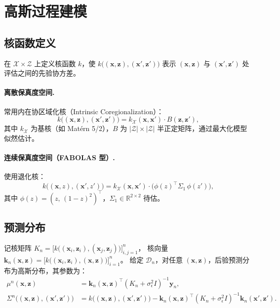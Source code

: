 \documentclass[11pt,a4paper]{article}
\newcommand{\bx}{\mathbf{x}}
\newcommand{\bz}{\mathbf{z}}
\newcommand{\cX}{\mathcal{X}}
\newcommand{\cZ}{\mathcal{Z}}
\newcommand{\cD}{\mathcal{D}}
\newcommand{\R}{\mathbb{R}}
\begin{document}
\section{高斯过程建模}

\subsection{核函数定义}

在 $\cX\times\cZ$ 上定义核函数 $k$，使
$k\bigl((\bx,\bz),(\bx',\bz')\bigr)$
表示 $(\bx,\bz)$ 与 $(\bx',\bz')$ 处评估之间的先验协方差。

\paragraph{离散保真度空间.}
常用内在协区域化核（Intrinsic Coregionalization）：
\begin{equation}
  k\bigl((\bx,\bz),(\bx',\bz')\bigr) = k_{\cX}(\bx,\bx')\cdot B(\bz,\bz'),
\end{equation}
其中 $k_{\cX}$ 为基核（如 Mat\'ern 5/2），$B$ 为 $|\cZ|\times|\cZ|$ 半正定矩阵，通过最大化模型似然估计。

\paragraph{连续保真度空间（FABOLAS 型）.}
使用退化核：
\begin{equation}
  k\bigl((\bx,z),(\bx',z')\bigr) = k_{\cX}(\bx,\bx')\cdot\bigl(\phi(z)^\top\Sigma_1\,\phi(z')\bigr),
\end{equation}
其中 $\phi(z)=(z,\,(1-z)^2)^\top$，$\Sigma_1\in\R^{2\times 2}$ 待估。

\subsection{预测分布}

记核矩阵 $K_n = \bigl[k\bigl((\bx_i,\bz_i),(\bx_j,\bz_j)\bigr)\bigr]_{i,j=1}^{n}$，
核向量 $\mathbf{k}_n(\bx,\bz) = \bigl[k\bigl((\bx_i,\bz_i),(\bx,\bz)\bigr)\bigr]_{i=1}^{n}$。
给定 $\cD_n$，对任意 $(\bx,\bz)$，后验预测分布为高斯分布，其参数为：
\begin{align}
  \mu^n(\bx,\bz) &= \mathbf{k}_n(\bx,\bz)^\top(K_n+\sigma_\epsilon^2 I)^{-1}\mathbf{y}_n, \label{eq:mu}\\
  \Sigma^n\bigl((\bx,\bz),(\bx',\bz')\bigr) &= k\bigl((\bx,\bz),(\bx',\bz')\bigr) - \mathbf{k}_n(\bx,\bz)^\top(K_n+\sigma_\epsilon^2 I)^{-1}\mathbf{k}_n(\bx',\bz'). \label{eq:sigma}
\end{align}
\end{document}
